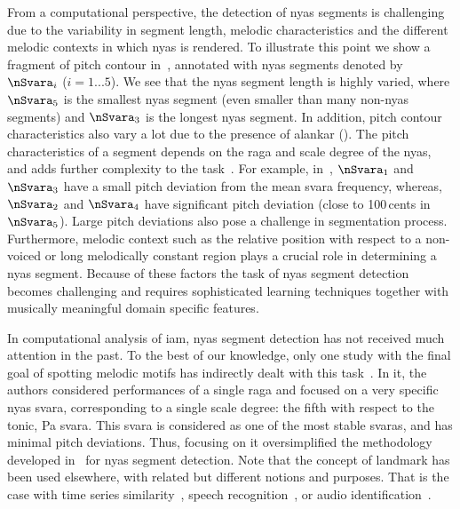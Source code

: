 {From a computational perspective, the detection of \gls{nyas} segments is challenging due to the variability in segment length, melodic characteristics and the different melodic contexts in which \gls{nyas} is rendered. To illustrate this point we show a fragment of pitch contour in~, annotated with \gls{nyas} segments denoted by $\nSvara_i$ ($i={1...5}$). We see that the \gls{nyas} segment length is highly varied, where $\nSvara_5$ is the smallest \gls{nyas} segment (even smaller than many non-\gls{nyas} segments) and $\nSvara_3$ is the longest \gls{nyas} segment. In addition, pitch contour characteristics also vary a lot due to the presence of \gls{alankar} (). The pitch characteristics of a segment depends on the \gls{raga} and scale degree of the \gls{nyas}, and adds further complexity to the task~\citep{Bagchee1998}. For example, in~, $\nSvara_1$ and $\nSvara_3$ have a small pitch deviation from the mean \gls{svara} frequency, whereas, $\nSvara_2$ and $\nSvara_4$ have significant pitch deviation (close to 100\,cents in $\nSvara_5$). Large pitch deviations also pose a challenge in segmentation process. Furthermore, melodic context such as the relative position with respect to a non-voiced or long melodically constant region plays a crucial role in determining a \gls{nyas} segment. Because of these factors the task of \gls{nyas} segment detection becomes challenging and requires sophisticated learning techniques together with musically meaningful domain specific features.

In computational analysis of \gls{iam}, \gls{nyas} segment detection has not received much attention in the past. To the best of our knowledge, only one study with the final goal of spotting melodic motifs has indirectly dealt with this task~\citep{Ross2012}. In it, the authors considered performances of a single \gls{raga} and focused on a very specific \gls{nyas} \gls{svara}, corresponding to a single scale degree: the fifth with respect to the tonic, Pa \gls{svara}. This \gls{svara} is considered as one of the most stable \glspl{svara}, and has minimal pitch deviations. Thus, focusing on it oversimplified the methodology developed in~\cite{Ross2012} for \gls{nyas} segment detection. Note that the concept of landmark has been used elsewhere, with related but different notions and purposes. That is the case with time series similarity~\citep{Perng00ICDE}, speech recognition~\citep{Jansen08JASA,Chen12ICASSP}, or audio identification~\citep{Duong13ICASSP}.

}
